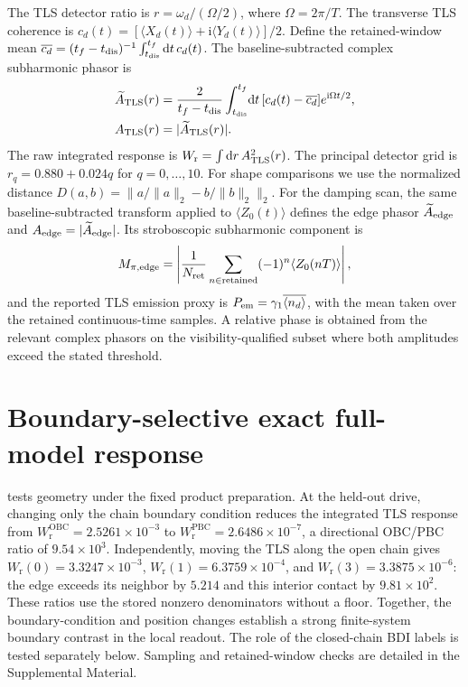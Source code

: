 \documentclass[12pt]{article}
\newcommand{\dd}{\mathrm{d}}
\newcommand{\ii}{\mathrm{i}}
\newcommand{\expect}[1]{\langle #1\rangle}
\newcommand{\Wraw}{W_{\mathrm r}}
\begin{document}
The TLS detector ratio is $r=\omega_d/(\Omega/2)$, where $\Omega=2\pi/T$. The transverse TLS coherence is $c_d(t)=[\expect{X_d(t)}+\ii\expect{Y_d(t)}]/2$. Define the retained-window mean $\overline{c_d}=(t_f-t_{\rm dis})^{-1}\int_{t_{\rm dis}}^{t_f}\dd t\,c_d(t)$. The baseline-subtracted complex subharmonic phasor is
\begin{equation}
\begin{aligned}
\widetilde A_{\rm TLS}(r)&=\frac{2}{t_f-t_{\rm dis}}\int_{t_{\rm dis}}^{t_f}\!\dd t\,
[c_d(t)-\overline{c_d}]e^{\ii\Omega t/2},\\
A_{\rm TLS}(r)&=|\widetilde A_{\rm TLS}(r)|.
\end{aligned}
\label{eq:phasor}
\end{equation}
The raw integrated response is $\Wraw=\int\dd r\,A_{\rm TLS}^2(r)$. The principal detector grid is $r_q=0.880+0.024q$ for $q=0,\ldots,10$. For shape comparisons we use the normalized distance $D(a,b)=\lVert a/\lVert a\rVert_2-b/\lVert b\rVert_2\rVert_2$. For the damping scan, the same baseline-subtracted transform applied to $\expect{Z_0(t)}$ defines the edge phasor $\widetilde A_{\rm edge}$ and $A_{\rm edge}=|\widetilde A_{\rm edge}|$. Its stroboscopic subharmonic component is
\begin{equation}
M_{\pi,{\rm edge}}=\left|\frac{1}{N_{\rm ret}}\sum_{n\in{\rm retained}}(-1)^n\expect{Z_0(nT)}\right|,
\end{equation}
and the reported TLS emission proxy is $P_{\rm em}=\gamma_1\overline{\expect{n_d}}$, with the mean taken over the retained continuous-time samples. A relative phase is obtained from the relevant complex phasors on the visibility-qualified subset where both amplitudes exceed the stated threshold.

\section{Boundary-selective exact full-model response}
\label{sec:boundary-response}

 tests geometry under the fixed product preparation. At the held-out drive, changing only the chain boundary condition reduces the integrated TLS response from $W_{\mathrm r}^{\mathrm{OBC}}=2.5261\times10^{-3}$ to $W_{\mathrm r}^{\mathrm{PBC}}=2.6486\times10^{-7}$, a directional OBC/PBC ratio of $9.54\times10^3$. Independently, moving the TLS along the open chain gives $\Wraw(0)=3.3247\times10^{-3}$, $\Wraw(1)=6.3759\times10^{-4}$, and $\Wraw(3)=3.3875\times10^{-6}$: the edge exceeds its neighbor by $5.214$ and this interior contact by $9.81\times10^2$. These ratios use the stored nonzero denominators without a floor. Together, the boundary-condition and position changes establish a strong finite-system boundary contrast in the local readout. The role of the closed-chain BDI labels is tested separately below. Sampling and retained-window checks are detailed in the Supplemental Material.
\end{document}
